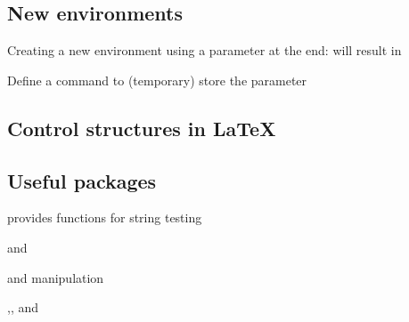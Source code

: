 \subsection{New environments}
\begin{frame}
\end{frame}
\begin{frame}
	Creating a new environment using a parameter at the end:
	will result in
\end{frame}
\begin{frame}
	Define a command to (temporary) store the parameter
\end{frame}


\subsection{Control structures in {\LaTeX}}
\begin{frame}
\end{frame}



\subsection{Useful packages}
\begin{frame}
	\begin{block}{\href{http://www.ctan.org/pkg/xstring}{}}
		provides functions for string testing
		\begin{center} and \end{center}
		and manipulation
		\begin{center},, and
			\end{center}
	\end{block}
\end{frame}

